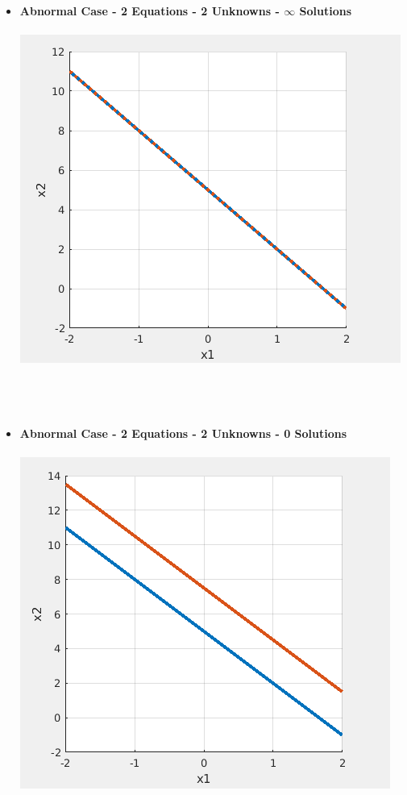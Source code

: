 \documentclass[11pt]{article}
\begin{document}
\begin{itemize}
\begin{itemize}
\newpage
\item {\bf Abnormal Case - 2 Equations - 2 Unknowns - $\infty$ Solutions} \\\\ \includegraphics[scale=1]{lecture4_fig2.png} \\\\
\\\\

\newpage
\item {\bf Abnormal Case - 2 Equations - 2 Unknowns - 0 Solutions} \\\\ \includegraphics[scale=1]{lecture4_fig3.png} \\\\
\\\\


\end{itemize}
\end{itemize}
\end{document}
